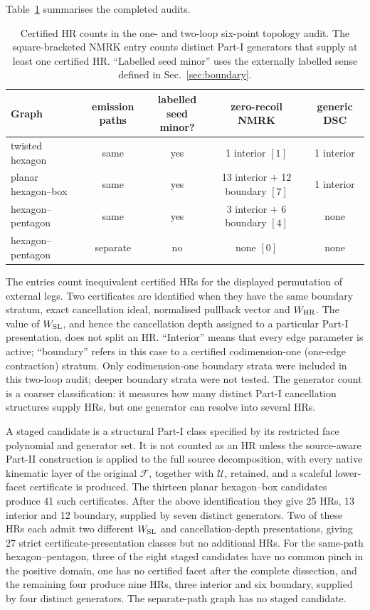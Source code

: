 \documentclass[a4paper,11pt]{article}
\begin{document}
Table~\ref{tab:six-point-two-loop-topology-audit} summarises the completed
audits.
\begin{table}[H]
\centering
\small
\setlength{\tabcolsep}{5pt}
\begin{tabular}{@{}lcccc@{}}
\toprule
Graph & emission paths & \shortstack{labelled seed\\minor?} & zero-recoil NMRK & generic DSC\\
\midrule
twisted hexagon & same & yes & 1 interior \([1]\) & 1 interior\\
planar hexagon--box & same & yes & 13 interior \(+\) 12 boundary \([7]\) & 1 interior\\
hexagon--pentagon & same & yes & 3 interior \(+\) 6 boundary \([4]\) & none\\
hexagon--pentagon & separate & no & none \([0]\) & none\\
\bottomrule
\end{tabular}
\caption{Certified HR counts in the one- and two-loop six-point topology
audit.  The square-bracketed NMRK entry counts distinct Part-I generators
that supply at least one certified HR.  ``Labelled seed minor'' uses the
externally labelled sense defined in
Sec.~\ref{sec:boundary}.}
\label{tab:six-point-two-loop-topology-audit}
\end{table}
The entries count inequivalent certified HRs for the displayed permutation
of external legs.  Two certificates are identified when they have the same
boundary stratum, exact cancellation ideal, normalised pullback vector and
\(W_{\rm HR}\).  The value of \(W_{\rm SL}\), and hence the cancellation depth
assigned to a particular Part-I presentation, does not split an HR.
``Interior'' means that every edge parameter is active; ``boundary'' refers
in this case to a certified codimension-one (one-edge contraction) stratum.
Only codimension-one boundary strata were included in this two-loop audit;
deeper boundary strata were not tested.  The generator count is a coarser
classification: it measures how many distinct Part-I cancellation
structures supply HRs, but one generator can resolve into several HRs.

A staged candidate is a structural Part-I class specified by its restricted
face polynomial and generator set.  It is not counted as an HR unless the
source-aware Part-II construction is applied to the full source
decomposition, with every native kinematic layer of the original
\(\mathcal F\), together with \(\mathcal U\), retained, and a scaleful
lower-facet certificate is produced.  The thirteen planar hexagon--box
candidates produce 41 such certificates.  After the above identification
they give 25 HRs, 13 interior and 12 boundary, supplied by seven distinct
generators.  Two of these HRs each admit two different \(W_{\rm SL}\) and
cancellation-depth presentations, giving 27 strict certificate-presentation
classes but no additional HRs.  For the same-path hexagon--pentagon, three
of the eight staged candidates have no common pinch in the positive domain,
one has no certified facet after the complete dissection, and the remaining
four produce nine HRs, three interior and six boundary, supplied by four
distinct generators.  The separate-path graph has no staged candidate.
\end{document}
